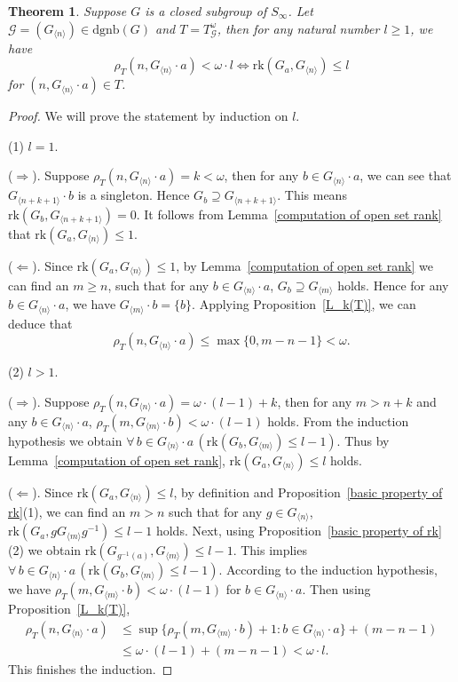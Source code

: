 \documentclass[11pt]{amsart}
\newtheorem{theorem}{Theorem}[section]
\theoremstyle{definition}
\theoremstyle{remark}
\numberwithin{equation}{section}
\def\dgnb{{\mathrm{dgnb}}}
\def\gnb#1{G_{\langle #1\rangle}}
\def\otr#1#2{T_{\mathcal{#1}}^{#2}}
\def\rk{\mathrm{rk}}
\begin{document}
\begin{theorem}\label{rank and balanced, finite case}
    Suppose $G$ is a closed subgroup of $S_\infty$. Let $\mathcal{G}=(\gnb{n})\in\dgnb(G)$ and $T=\otr{G}{\omega}$, then for any natural number $l\geq 1$, we have
    $$\rho_T(n,\gnb{n}\cdot a)<\omega\cdot l\iff\rk(G_a,\gnb{n})\leq l$$
    for $(n,\gnb{n}\cdot a)\in T$.
\end{theorem}
\begin{proof}
    We will prove the statement by induction on $l$.

    (1) $l=1$.

    ($\Rightarrow$). Suppose $\rho_T(n,\gnb{n}\cdot a)=k<\omega$, then for any $b\in\gnb{n}\cdot a$, we can see that $\gnb{n+k+1}\cdot b$ is a singleton. Hence $G_b\supseteq\gnb{n+k+1}$. This means $\rk(G_b,\gnb{n+k+1})=0$. It follows from Lemma~\ref{computation of open set rank} that $\rk(G_a,\gnb{n})\leq1$.

    ($\Leftarrow$). Since $\rk(G_a,\gnb{n})\leq 1$, by Lemma~\ref{computation of open set rank} we can find an $m\geq n$, such that for any $b\in\gnb{n}\cdot a$, $G_b\supseteq\gnb{m}$ holds. Hence for any $b\in\gnb{n}\cdot a$, we have $\gnb{m}\cdot b=\{b\}$. Applying Proposition~\ref{L_k(T)}, we can deduce that
    $$\rho_T(n,\gnb{n}\cdot a)\leq\max\{0,m-n-1\}<\omega.$$

    (2) $l>1$.

    ($\Rightarrow$). Suppose $\rho_T(n,\gnb{n}\cdot a)=\omega\cdot(l-1)+k$, then for any $m>n+k$ and any $b\in\gnb{n}\cdot a$, $\rho_T(m,\gnb{m}\cdot b)<\omega\cdot(l-1)$ holds. From the induction hypothesis we obtain $\forall\,b\in\gnb{n}\cdot a\,(\rk(G_b,\gnb{m})\leq l-1)$. Thus by Lemma~\ref{computation of open set rank}, $\rk(G_a,\gnb{n})\leq l$ holds.

    ($\Leftarrow$). Since $\rk(G_a,\gnb{n})\leq l$, by definition and Proposition~\ref{basic property of rk}(1), we can find an $m>n$ such that for any $g\in\gnb{n}$, $\rk(G_a,g\gnb{m}g^{-1})\leq l-1$ holds. Next, using Proposition~\ref{basic property of rk}(2) we obtain $\rk(G_{g^{-1}(a)},\gnb{m})\le l-1$. This implies $\forall\,b\in\gnb{n}\cdot a\,(\rk(G_b,\gnb{m})\le l-1)$. According to the induction hypothesis, we have $\rho_T(m,\gnb{m}\cdot b)<\omega\cdot(l-1)$ for $b\in\gnb{n}\cdot a$. Then using Proposition~\ref{L_k(T)},
    \begin{align*}
        \rho_T(n,\gnb{n}\cdot a)&\leq\sup\{\rho_T(m,\gnb{m}\cdot b)+1:b\in\gnb{n}\cdot a\}+(m-n-1)\\
        &\leq\omega\cdot(l-1)+(m-n-1)<\omega\cdot l.
    \end{align*}
   This finishes the induction.
\end{proof}
\end{document}
